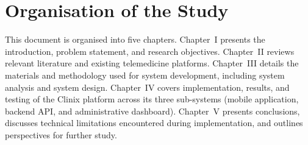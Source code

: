 \section{Organisation of the Study}

This document is organised into five chapters. Chapter~I presents the introduction, problem statement, and research objectives. Chapter~II reviews relevant literature and existing telemedicine platforms. Chapter~III details the materials and methodology used for system development, including system analysis and system design. Chapter~IV covers implementation, results, and testing of the Clinix platform across its three sub-systems (mobile application, backend API, and administrative dashboard). Chapter~V presents conclusions, discusses technical limitations encountered during implementation, and outlines perspectives for further study.
